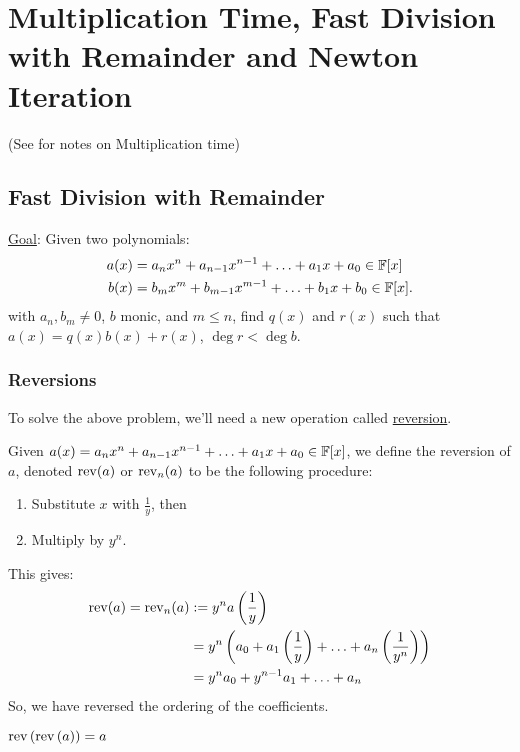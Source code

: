 
\section{Multiplication Time, Fast Division with Remainder and Newton Iteration}

(See  for notes on Multiplication time)

\subsection{Fast Division with Remainder}
\ul{Goal}: Given two polynomials: 
\begin{align*}
    a(x) &= a_nx^n + a_{n-1}x^{n-1} + \ldots + a_1x + a_0 \in \operatorname{\mathbb{F}}[x] \\
    b(x) &= b_mx^m + b_{m-1}x^{m-1} + \ldots + b_1x + b_0 \in \operatorname{\mathbb{F}}[x].
\end{align*} 
with $a_n, b_m \neq 0$, $b$ monic, and $m \leq n$, find $q(x)$ and $r(x)$ such that $a(x) = q(x)b(x) + r(x)$, $\deg r < \deg b$.

\subsubsection{Reversions}
To solve the above problem, we'll need a new operation called \ul{reversion}. 

Given $a(x) = a_nx^n + a_{n-1}x^{n-1} + \ldots + a_1x + a_0 \in \operatorname{\mathbb{F}}[x]$, we define the reversion of $a$, denoted $\operatorname{rev}(a)$ or $\operatorname{rev}_n(a)$ to be the following procedure:
\begin{enumerate}
    \item Substitute $x$ with $\frac{1}{y}$, then
    \item Multiply by $y^n$.
\end{enumerate} 
This gives:
\begin{equation}
    \begin{aligned}
        \operatorname{rev}(a) = \operatorname{rev}_n(a) &:= y^na\left(\frac{1}{y}\right) \\
        &= y^n\left(a_0 + a_1\left(\frac{1}{y}\right) + \ldots + a_n\left(\frac{1}{y^n}\right)\right) \\
        &= y^na_0 + y^{n-1}a_1 + \ldots + a_n
    \end{aligned}
\end{equation}
So, we have reversed the ordering of the coefficients.

\begin{remark}
    $\operatorname{rev}\left(\operatorname{rev}\left(a\right)\right) = a$
\end{remark}

